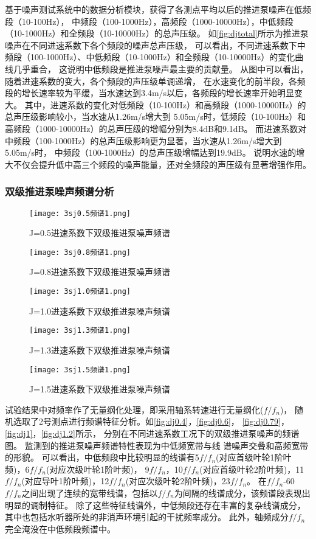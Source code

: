 基于噪声测试系统中的数据分析模块，获得了各测点平均以后的推进泵噪声在低频段（10-100Hz），
中频段（100-1000Hz），高频段（1000-10000Hz），中低频段（10-1000Hz）和全频段（10-10000Hz）的总声压级。
如\autoref{fig:djtotal}所示为推进泵噪声在不同进速系数下各个频段的噪声总声压级，
可以看出，不同进速系数下中频段（100-1000Hz）、中低频段（10-1000Hz）和全频段（10-10000Hz）的变化曲线几乎重合，
这说明中低频段是推进泵噪声最主要的贡献量。
从图中可以看出，随着进速系数的变大，各个频段的声压级单调递增，
在水速变化的前半段，各频段的增长速率较为平缓，当水速达到3.4m/s以后，各频段的增长速率开始明显变大。
其中，进速系数的变化对低频段（10-100Hz）和高频段（1000-10000Hz）的总声压级影响较小，当水速从1.26m/s增大到
5.05m/s时，低频段（10-100Hz）和高频段（1000-10000Hz）的总声压级的增幅分别为8.4dB和9.1dB。
而进速系数对中频段（100-1000Hz）的总声压级影响更为显著，当水速从1.26m/s增大到5.05m/s时，
中频段（100-1000Hz）的总声压级增幅达到19.9dB。
说明水速的增大不仅会提升低中高三个频段的噪声能量，还对全频段的声压级有显著增强作用。
\subsubsection{双级推进泵噪声频谱分析}
\begin{figure}[htbp]
    \centering
    \texttt{[image: 3sj0.5频谱1.png]}
    \caption{\label{fig:sj0.5}J=0.5进速系数下双级推进泵噪声频谱}
\end{figure}
\begin{figure}[htbp]
    \centering
    \texttt{[image: 3sj0.8频谱1.png]}
    \caption{\label{fig:sj0.8}J=0.8进速系数下双级推进泵噪声频谱}
\end{figure}
\begin{figure}[htbp]
    \centering
    \texttt{[image: 3sj1.0频谱1.png]}
    \caption{\label{fig:sj1.0}J=1.0进速系数下双级推进泵噪声频谱}
\end{figure}
\begin{figure}[htbp]
    \centering
    \texttt{[image: 3sj1.3频谱1.png]}
    \caption{\label{fig:sj1.3}J=1.3进速系数下双级推进泵噪声频谱}
\end{figure}
\begin{figure}[htbp]
    \centering
    \texttt{[image: 3sj1.5频谱1.png]}
    \caption{\label{fig:sj1.5}J=1.5进速系数下双级推进泵噪声频谱}
\end{figure}

试验结果中对频率作了无量纲化处理，即采用轴系转速进行无量纲化($f/f_n$)，
随机选取了2号测点进行频谱特征分析。如\autoref{fig:dj0.4}，\autoref{fig:dj0.6}，
\autoref{fig:dj0.79}，\autoref{fig:dj1}，\autoref{fig:dj1.2}所示，
分别在不同进速系数工况下的双级推进泵噪声的频谱图。
监测到的推进泵噪声频谱特性表现为中低频宽带与线
谱噪声交叠和高频宽带的形貌。
可以看出，中低频段中比较明显的线谱有5$f/f_n$(对应首级叶轮1阶叶频)，6$f/f_n$(对应次级叶轮1阶叶频)，
9$f/f_n$，10$f/f_n$(对应首级叶轮2阶叶频)，11$f/f_n$(对应导叶1阶叶频)，12$f/f_n$(对应次级叶轮2阶叶频)，23$f/f_n$。
在$f/f_n$-60$f/f_n$之间出现了连续的宽带线谱，包括以$f/f_n$为间隔的线谱成分，该频谱段表现出明显的调制特征。
除了这些特征线谱外，中低频段还存在丰富的复杂线谱成分，
其中也包括水听器所处的非消声环境引起的干扰频率成分。
此外，轴频成分$f/f_n$完全淹没在中低频段频谱中。

